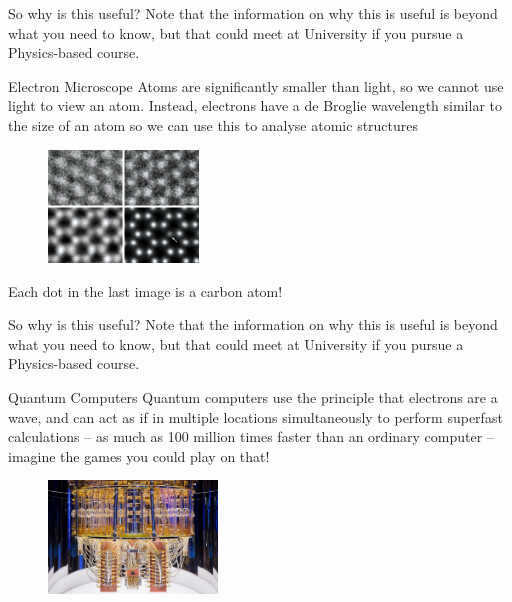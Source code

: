 \documentclass[../Main.tex]{subfiles}
\begin{document}
    \begin{frame}{So why is this useful?}
        Note that the information on why this is useful is beyond what you need to know, but that could meet at University if you pursue a Physics-based course.
        
        \begin{block}{Electron Microscope}
            Atoms are significantly smaller than light, so we cannot use light to view an atom. Instead, electrons have a de Broglie wavelength similar to the size of an atom so we can use this to analyse atomic structures
            \begin{figure}
                \centering
                \includegraphics[height=3cm]{Quantum_Images/graphene.jpg}
            \end{figure}
            Each dot in the last image is a carbon atom!
        \end{block}
    \end{frame}
    
    \begin{frame}{So why is this useful?}
        Note that the information on why this is useful is beyond what you need to know, but that could meet at University if you pursue a Physics-based course.
        
        \begin{block}{Quantum Computers}
        Quantum computers use the principle that electrons are a wave, and can act as if in multiple locations simultaneously to perform superfast calculations -- as much as 100 million times faster than an ordinary computer -- imagine the games you could play on that!
            \begin{figure}
                \centering
                \includegraphics[height=3cm]{Quantum_Images/quantumcomputer.jpg}
            \end{figure}
        \end{block}
    \end{frame}
\end{document}
